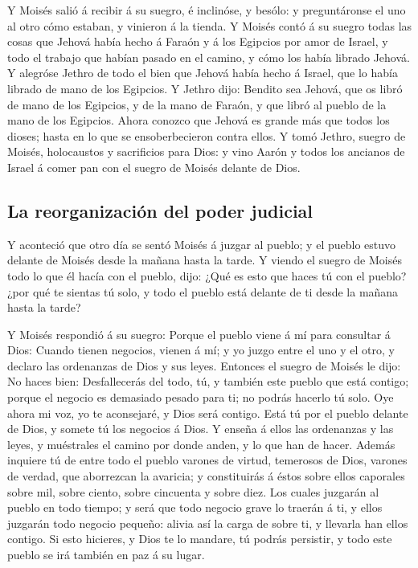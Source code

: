  Y Moisés salió á recibir á su suegro, é inclinóse, y
besólo: y preguntáronse el uno al otro cómo estaban, y vinieron á la
tienda.  Y Moisés contó á su suegro todas las cosas que
Jehová había hecho á Faraón y á los Egipcios por amor de Israel, y todo
el trabajo que habían pasado en el camino, y cómo los había librado
Jehová.  Y alegróse Jethro de todo el bien que Jehová había
hecho á Israel, que lo había librado de mano de los Egipcios.
 Y Jethro dijo: Bendito sea Jehová, que os libró de mano de
los Egipcios, y de la mano de Faraón, y que libró al pueblo de la mano
de los Egipcios.  Ahora conozco que Jehová es grande más
que todos los dioses; hasta en lo que se ensoberbecieron contra ellos.
 Y tomó Jethro, suegro de Moisés, holocaustos y sacrificios
para Dios: y vino Aarón y todos los ancianos de Israel á comer pan con
el suegro de Moisés delante de Dios.

\hypertarget{la-reorganizaciuxf3n-del-poder-judicial}{%
\subsection{La reorganización del poder
judicial}\label{la-reorganizaciuxf3n-del-poder-judicial}}

 Y aconteció que otro día se sentó Moisés á juzgar al
pueblo; y el pueblo estuvo delante de Moisés desde la mañana hasta la
tarde.  Y viendo el suegro de Moisés todo lo que él hacía
con el pueblo, dijo: ¿Qué es esto que haces tú con el pueblo? ¿por qué
te sientas tú solo, y todo el pueblo está delante de ti desde la mañana
hasta la tarde?

 Y Moisés respondió á su suegro: Porque el pueblo viene á
mí para consultar á Dios:  Cuando tienen negocios, vienen á
mí; y yo juzgo entre el uno y el otro, y declaro las ordenanzas de Dios
y sus leyes.  Entonces el suegro de Moisés le dijo: No
haces bien:  Desfallecerás del todo, tú, y también este
pueblo que está contigo; porque el negocio es demasiado pesado para ti;
no podrás hacerlo tú solo.  Oye ahora mi voz, yo te
aconsejaré, y Dios será contigo. Está tú por el pueblo delante de Dios,
y somete tú los negocios á Dios.  Y enseña á ellos las
ordenanzas y las leyes, y muéstrales el camino por donde anden, y lo que
han de hacer.  Además inquiere tú de entre todo el pueblo
varones de virtud, temerosos de Dios, varones de verdad, que aborrezcan
la avaricia; y constituirás á éstos sobre ellos caporales sobre mil,
sobre ciento, sobre cincuenta y sobre diez.  Los cuales
juzgarán al pueblo en todo tiempo; y será que todo negocio grave lo
traerán á ti, y ellos juzgarán todo negocio pequeño: alivia así la carga
de sobre ti, y llevarla han ellos contigo.  Si esto
hicieres, y Dios te lo mandare, tú podrás persistir, y todo este pueblo
se irá también en paz á su lugar.

